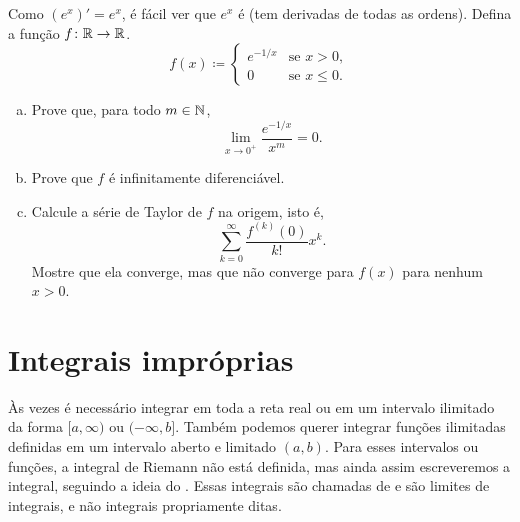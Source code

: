 \begin{exercise}\label{exercise:nonanalytic}
Como $(e^x)' = e^x$, é fácil ver que $e^x$ é
(tem derivadas de todas as ordens). Defina a função $f \colon {\mathbb{R}} \to {\mathbb{R}}$.
\begin{equation*}
f(x) \coloneqq \begin{cases}
e^{-1/x} & \text{se } x > 0, \\
0 & \text{se } x \leq 0.
\end{cases}
\end{equation*}
\begin{enumerate}[a)]
\item
Prove que, para todo $m \in {\mathbb{N}}$,
\begin{equation*}
\lim_{x \to 0^+} \frac{e^{-1/x}}{x^m} = 0 .
\end{equation*}
\item
Prove que $f$ é infinitamente diferenciável.
\item
Calcule a série de Taylor de $f$ na origem, isto é,
\begin{equation*}
\sum_{k=0}^\infty
\frac{f^{(k)}(0)}{k!}x^k .
\end{equation*}
Mostre que ela converge, mas que não converge para $f(x)$
para nenhum $x > 0$.
\end{enumerate}
\end{exercise}


\sectionnewpage
\section{Integrais impróprias}
\label{sec:impropriemann}



Às vezes é necessário integrar em toda a reta real ou em um intervalo
ilimitado da forma $[a,\infty)$ ou $(-\infty,b]$.
Também podemos querer integrar funções ilimitadas definidas em um intervalo
aberto e limitado $(a,b)$.
Para esses intervalos ou funções, a integral de Riemann não está definida,
mas ainda assim escreveremos a integral, seguindo a ideia do
.
Essas integrais são chamadas de \emph{}
e são limites de integrais, e não integrais propriamente ditas.

